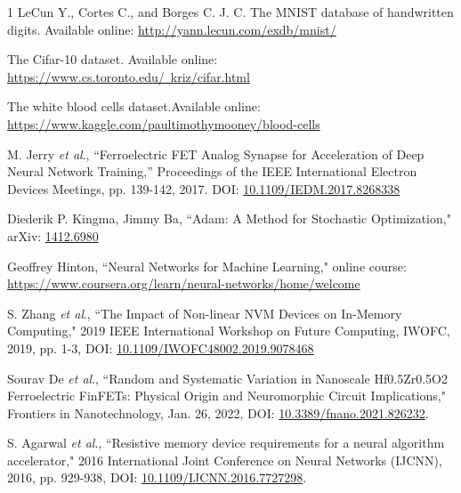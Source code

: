 \documentclass[journal]{IEEEtran}
\begin{document}
\begin{thebibliography}{1}
LeCun Y., Cortes C., and Borges C. J. C. The MNIST database of handwritten digits. Available online: \href{http://yann.lecun.com/exdb/mnist/}{http://yann.lecun.com/exdb/mnist/}

The Cifar-10 dataset. Available online: \href{http://www.cs.toronto.edu/~kriz/cifar.html}{https://www.cs.toronto.edu/~kriz/cifar.html}

The white blood cells dataset.Available online: \href{https://www.kaggle.com/paultimothymooney/blood-cells}{https://www.kaggle.com/paultimothymooney/blood-cells}

M. Jerry \emph{et al}., ``Ferroelectric FET Analog Synapse for Acceleration of Deep Neural Network Training,” Proceedings of the IEEE International Electron Devices Meetings, pp. 139-142, 2017. DOI: \href{https://ieeexplore.ieee.org/document/8268338}{10.1109/IEDM.2017.8268338}

Diederik P. Kingma, Jimmy Ba, ``Adam: A Method for Stochastic Optimization," arXiv: \href{https://arxiv.org/abs/1412.6980}{1412.6980}

Geoffrey Hinton, ``Neural Networks for Machine Learning," online course: \href{https://www.coursera.org/learn/neural-networks/home/welcome}{https://www.coursera.org/learn/neural-networks/home/welcome}

S. Zhang \emph{et al}., ``The Impact of Non-linear NVM Devices on In-Memory Computing," 2019 IEEE International Workshop on Future Computing, IWOFC, 2019, pp. 1-3, DOI: \href{https://ieeexplore.ieee.org/document/9078468}{10.1109/IWOFC48002.2019.9078468}

Sourav De \emph{et al}., ``Random and Systematic Variation in Nanoscale Hf0.5Zr0.5O2 Ferroelectric FinFETs: Physical Origin and Neuromorphic Circuit Implications," Frontiers in Nanotechnology, Jan. 26, 2022, DOI: \href{https://www.frontiersin.org/articles/10.3389/fnano.2021.826232/full}{10.3389/fnano.2021.826232}.

S. Agarwal \emph{et al}., ``Resistive memory device requirements for a neural algorithm accelerator," 2016 International Joint Conference on Neural Networks (IJCNN), 2016, pp. 929-938, DOI: \href{https://ieeexplore.ieee.org/document/7727298}{10.1109/IJCNN.2016.7727298}.


\end{thebibliography}
\end{document}
